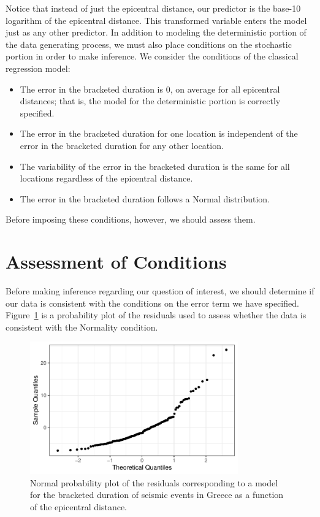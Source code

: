 \documentclass[
  letterpaper,
  DIV=11,
  numbers=noendperiod]{scrreprt}
\providecommand{\tightlist}{%
  \setlength{\itemsep}{0pt}\setlength{\parskip}{0pt}}\usepackage{longtable,booktabs,array}
\theoremstyle{definition}
\theoremstyle{definition}
\theoremstyle{plain}
\theoremstyle{remark}
\begin{document}
Notice that instead of just the epicentral distance, our predictor is
the base-10 logarithm of the epicentral distance. This transformed
variable enters the model just as any other predictor. In addition to
modeling the deterministic portion of the data generating process, we
must also place conditions on the stochastic portion in order to make
inference. We consider the conditions of the classical regression model:

\begin{itemize}
\tightlist
\item
  The error in the bracketed duration is 0, on average for all
  epicentral distances; that is, the model for the deterministic portion
  is correctly specified.
\item
  The error in the bracketed duration for one location is independent of
  the error in the bracketed duration for any other location.
\item
  The variability of the error in the bracketed duration is the same for
  all locations regardless of the epicentral distance.
\item
  The error in the bracketed duration follows a Normal distribution.
\end{itemize}

Before imposing these conditions, however, we should assess them.

\hypertarget{assessment-of-conditions}{%
\section{Assessment of Conditions}\label{assessment-of-conditions}}

Before making inference regarding our question of interest, we should
determine if our data is consistent with the conditions on the error
term we have specified. Figure~\ref{fig-regrecap-normality} is a
probability plot of the residuals used to assess whether the data is
consistent with the Normality condition.

\begin{figure}

{\centering \includegraphics[width=0.8\textwidth,height=\textheight]{./images/fig-regrecap-normality-1.pdf}

}

\caption{\label{fig-regrecap-normality}Normal probability plot of the
residuals corresponding to a model for the bracketed duration of seismic
events in Greece as a function of the epicentral distance.}

\end{figure}
\end{document}
